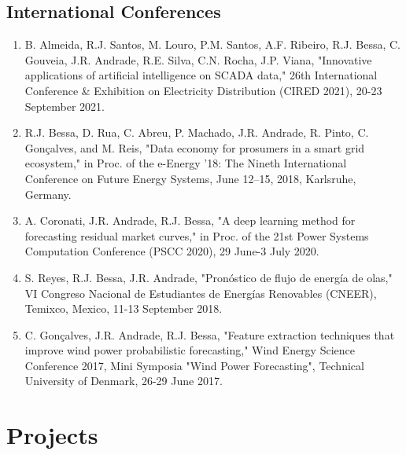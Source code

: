 \documentclass{mycv}
\begin{document}
\subsection{International Conferences}

\begin{enumerate}
	\item B. Almeida, R.J. Santos, M. Louro, P.M. Santos, A.F. Ribeiro, R.J. Bessa, C. Gouveia, J.R. Andrade, R.E. Silva, C.N. Rocha, J.P. Viana, "Innovative applications of artificial intelligence on SCADA data," 26th International Conference \& Exhibition on Electricity Distribution (CIRED 2021), 20-23 September 2021.

	\item R.J. Bessa, D. Rua, C. Abreu, P. Machado, J.R. Andrade, R. Pinto, C. Gonçalves, and M. Reis, "Data economy for prosumers in a smart grid ecosystem," in Proc. of the e-Energy ’18: The Nineth International Conference on Future Energy Systems, June 12–15, 2018, Karlsruhe, Germany.
	
	\item A. Coronati, J.R. Andrade, R.J. Bessa, "A deep learning method for forecasting residual market curves," in Proc. of the 21st Power Systems Computation Conference (PSCC 2020), 29 June-3 July 2020.
	
	\item S. Reyes, R.J. Bessa, J.R. Andrade, "Pronóstico de flujo de energía de olas," VI Congreso Nacional de Estudiantes de Energías Renovables (CNEER), Temixco, Mexico, 11-13 September 2018.
	
	\item C. Gonçalves, J.R. Andrade, R.J. Bessa, "Feature extraction techniques that improve wind power probabilistic forecasting," Wind Energy Science Conference 2017, Mini Symposia "Wind Power Forecasting", Technical University of Denmark, 26-29 June 2017.

\end{enumerate}


\section{Projects}

	\vspace{0.15cm}	
\end{document}
